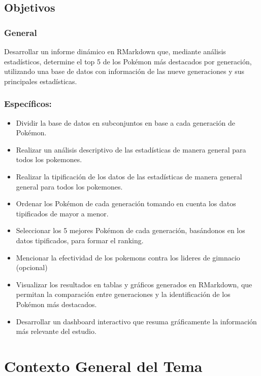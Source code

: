 \documentclass[
]{article}
\providecommand{\tightlist}{%
  \setlength{\itemsep}{0pt}\setlength{\parskip}{0pt}}
\begin{document}
\subsection{Objetivos}\label{objetivos}

\subsubsection{General}\label{general}

Desarrollar un informe dinámico en RMarkdown que, mediante análisis
estadísticos, determine el top 5 de los Pokémon más destacados por
generación, utilizando una base de datos con información de las nueve
generaciones y sus principales estadísticas.

\subsubsection{Específicos:}\label{especuxedficos}

\begin{itemize}
\tightlist
\item
  Dividir la base de datos en subconjuntos en base a cada generación de
  Pokémon.
\item
  Realizar un análisis descriptivo de las estadísticas de manera general
  para todos los pokemones.
\item
  Realizar la tipificación de los datos de las estadísticas de manera
  general general para todos los pokemones.
\item
  Ordenar los Pokémon de cada generación tomando en cuenta los datos
  tipificados de mayor a menor.
\item
  Seleccionar los 5 mejores Pokémon de cada generación, basándonos en
  los datos tipificados, para formar el ranking.
\item
  Mencionar la efectividad de los pokemons contra los lideres de
  gimnacio (opcional)
\item
  Visualizar los resultados en tablas y gráficos generados en RMarkdown,
  que permitan la comparación entre generaciones y la identificación de
  los Pokémon más destacados.
\item
  Desarrollar un dashboard interactivo que resuma gráficamente la
  información más relevante del estudio.
\end{itemize}

\section{Contexto General del Tema}\label{contexto-general-del-tema}
\end{document}
